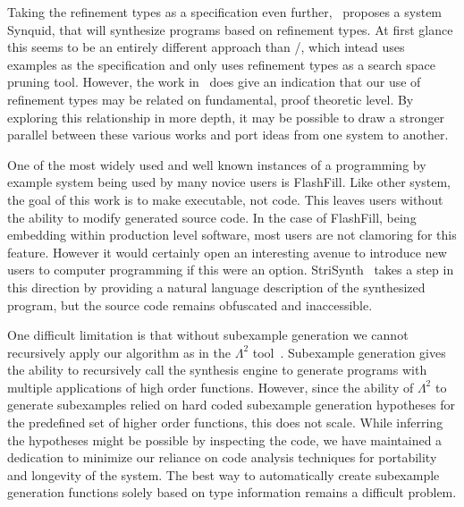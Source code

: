 Taking the refinement types as a specification even further,~\cite{dblp1683325} proposes a system Synquid, that will synthesize programs based on refinement types. At first glance this seems to be an entirely different approach than \ourTool/, which intead uses examples as the specification and only uses refinement types as a search space pruning tool. However, the work in~\cite{Osera:2016} does give an indication that our use of refinement types may be related on fundamental, proof theoretic level. By exploring this relationship in more depth, it may be possible to draw a stronger parallel between these various works and port ideas from one system to another.

One of the most widely used and well known instances of a programming by example system being used by many novice users is FlashFill\cite{GulwaniHS12}. Like other system, the goal of this work is to make executable, not code. This leaves users without the ability to modify generated source code. In the case of FlashFill, being embedding within production level software, most users are not clamoring for this feature. However it would certainly open an interesting avenue to introduce new users to computer programming if this were an option. StriSynth~\cite{icse} takes a step in this direction by providing a natural language description of the synthesized program, but the source code remains obfuscated and inaccessible.

One difficult limitation is that without subexample generation we cannot recursively apply our algorithm as in the $\Lambda^2$ tool~\cite{Feser:2015}.
Subexample generation gives the ability to recursively call the synthesis engine to generate programs with multiple applications of high order functions.
However, since the ability of $\Lambda^2$ to generate subexamples relied on hard coded subexample generation hypotheses for the predefined set of higher order functions, this does not scale.
While inferring the hypotheses might be possible by inspecting the code, we have maintained a dedication to minimize our reliance on code analysis techniques for portability and longevity of the system. 
The best way to automatically create subexample generation functions solely based on type information remains a difficult problem.
